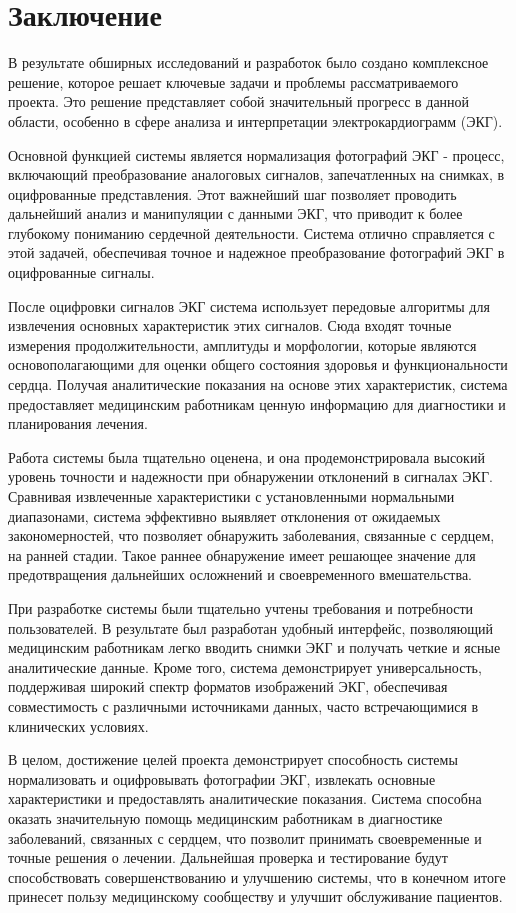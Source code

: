 \section{Заключение}
В результате обширных исследований и разработок было создано комплексное решение, которое решает ключевые задачи и проблемы рассматриваемого проекта. Это решение представляет собой значительный прогресс в данной области, особенно в сфере анализа и интерпретации электрокардиограмм (ЭКГ).

Основной функцией системы является нормализация фотографий ЭКГ - процесс, включающий преобразование аналоговых сигналов, запечатленных на снимках, в оцифрованные представления. Этот важнейший шаг позволяет проводить дальнейший анализ и манипуляции с данными ЭКГ, что приводит к более глубокому пониманию сердечной деятельности. Система отлично справляется с этой задачей, обеспечивая точное и надежное преобразование фотографий ЭКГ в оцифрованные сигналы.

После оцифровки сигналов ЭКГ система использует передовые алгоритмы для извлечения основных характеристик этих сигналов. Сюда входят точные измерения продолжительности, амплитуды и морфологии, которые являются основополагающими для оценки общего состояния здоровья и функциональности сердца. Получая аналитические показания на основе этих характеристик, система предоставляет медицинским работникам ценную информацию для диагностики и планирования лечения.

Работа системы была тщательно оценена, и она продемонстрировала высокий уровень точности и надежности при обнаружении отклонений в сигналах ЭКГ. Сравнивая извлеченные характеристики с установленными нормальными диапазонами, система эффективно выявляет отклонения от ожидаемых закономерностей, что позволяет обнаружить заболевания, связанные с сердцем, на ранней стадии. Такое раннее обнаружение имеет решающее значение для предотвращения дальнейших осложнений и своевременного вмешательства.

При разработке системы были тщательно учтены требования и потребности пользователей. В результате был разработан удобный интерфейс, позволяющий медицинским работникам легко вводить снимки ЭКГ и получать четкие и ясные аналитические данные. Кроме того, система демонстрирует универсальность, поддерживая широкий спектр форматов изображений ЭКГ, обеспечивая совместимость с различными источниками данных, часто встречающимися в клинических условиях.

В целом, достижение целей проекта демонстрирует способность системы нормализовать и оцифровывать фотографии ЭКГ, извлекать основные характеристики и предоставлять аналитические показания. Система способна оказать значительную помощь медицинским работникам в диагностике заболеваний, связанных с сердцем, что позволит принимать своевременные и точные решения о лечении. Дальнейшая проверка и тестирование будут способствовать совершенствованию и улучшению системы, что в конечном итоге принесет пользу медицинскому сообществу и улучшит обслуживание пациентов.